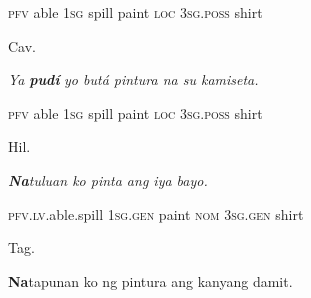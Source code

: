 \begin{stylelsIMT}
\textsc{pfv }able 1\textsc{sg }spill paint\textsc{ loc }3\textsc{sg.poss }shirt
\end{stylelsIMT}

\begin{listWWNumiileveli}
\item 
\begin{listWWNumiilevelii}
\item 
\begin{stylelsLanginfo}
Cav.
\end{stylelsLanginfo}
\end{listWWNumiilevelii}
\end{listWWNumiileveli}
\begin{stylelsIMT}
\textit{Ya }\textbf{\textit{pud\'{i}}}\textit{ yo but\'{a} pintura na su kamiseta.}
\end{stylelsIMT}

\begin{stylelsIMT}
\textsc{pfv} able 1\textsc{sg }spill paint\textsc{ loc }3\textsc{sg.poss }shirt
\end{stylelsIMT}

\begin{listWWNumiileveli}
\item 
\begin{listWWNumiilevelii}
\item 
\begin{stylelsLanginfo}
Hil.
\end{stylelsLanginfo}
\end{listWWNumiilevelii}
\end{listWWNumiileveli}
\begin{stylelsIMT}
\textbf{\textit{Na}}\textit{tuluan ko pinta ang iya bayo.}
\end{stylelsIMT}

\begin{stylelsIMT}
\textsc{pfv}.\textsc{lv}.able.spill \textsc{1sg.gen} paint \textsc{nom }3\textsc{sg.gen }shirt
\end{stylelsIMT}

\begin{listWWNumiileveli}
\item 
\begin{listWWNumiilevelii}
\item 
\begin{stylelsLanginfo}
Tag.
\end{stylelsLanginfo}
\end{listWWNumiilevelii}
\end{listWWNumiileveli}
\begin{stylelsSourceline}
\textbf{Na}tapunan ko ng pintura ang kanyang damit.
\end{stylelsSourceline}

